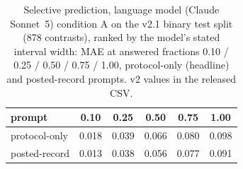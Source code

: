 \begin{table}[h]\centering\small
\caption{Selective prediction, language model (Claude Sonnet~5) condition A on the v2.1 binary test split (878 contrasts), ranked by the model's stated interval width: MAE at answered fractions 0.10 / 0.25 / 0.50 / 0.75 / 1.00, protocol-only (headline) and posted-record prompts. v2 values in the released CSV.}
\label{tab:lmsel}
\begin{tabular}{lccccc}\toprule prompt & 0.10 & 0.25 & 0.50 & 0.75 & 1.00 \\ \midrule
protocol-only & 0.018 & 0.039 & 0.066 & 0.080 & 0.098 \\
posted-record & 0.013 & 0.038 & 0.056 & 0.077 & 0.091 \\
\bottomrule\end{tabular}\end{table}
